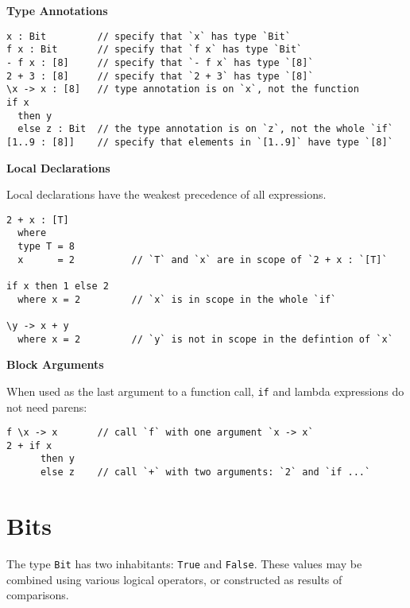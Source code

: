 \textbf{Type Annotations}

\begin{verbatim}
x : Bit         // specify that `x` has type `Bit`
f x : Bit       // specify that `f x` has type `Bit`
- f x : [8]     // specify that `- f x` has type `[8]`
2 + 3 : [8]     // specify that `2 + 3` has type `[8]`
\x -> x : [8]   // type annotation is on `x`, not the function
if x
  then y
  else z : Bit  // the type annotation is on `z`, not the whole `if`
[1..9 : [8]]    // specify that elements in `[1..9]` have type `[8]`
\end{verbatim}

\textbf{Local Declarations}

Local declarations have the weakest precedence of all expressions.

\begin{verbatim}
2 + x : [T]
  where
  type T = 8
  x      = 2          // `T` and `x` are in scope of `2 + x : `[T]`

if x then 1 else 2
  where x = 2         // `x` is in scope in the whole `if`

\y -> x + y
  where x = 2         // `y` is not in scope in the defintion of `x`
\end{verbatim}

\textbf{Block Arguments}

When used as the last argument to a function call, \texttt{if} and
lambda expressions do not need parens:

\begin{verbatim}
f \x -> x       // call `f` with one argument `x -> x`
2 + if x
      then y
      else z    // call `+` with two arguments: `2` and `if ...`
\end{verbatim}

\section{Bits}\label{bits}

The type \texttt{Bit} has two inhabitants: \texttt{True} and
\texttt{False}. These values may be combined using various logical
operators, or constructed as results of comparisons.

